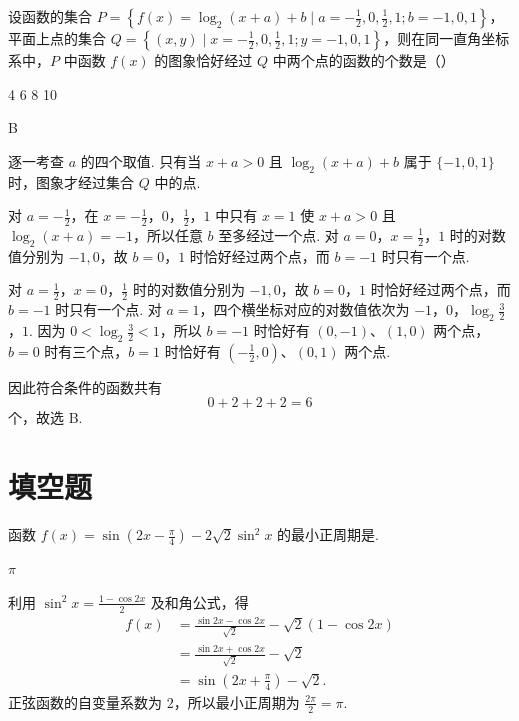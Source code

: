 \begin{problem}
设函数的集合 \(P = \left\{f(x) = \log_2(x + a) + b \mid a = -\frac{1}{2}, 0, \frac{1}{2}, 1; b = -1, 0, 1\right\}\)，平面上点的集合 \(Q = \left\{(x, y) \mid x = -\frac{1}{2}, 0, \frac{1}{2}, 1; y = -1, 0, 1\right\}\)，则在同一直角坐标系中，\(P\) 中函数 \(f(x)\) 的图象恰好经过 \(Q\) 中两个点的函数的个数是（\quad）

\choices
    {4}
    {6}
    {8}
    {10}
\begin{answer}
B
\end{answer}

\begin{solution}
逐一考查 \(a\) 的四个取值. 只有当 \(x+a>0\) 且 \(\log_2(x+a)+b\) 属于 \(\{-1,0,1\}\) 时，图象才经过集合 \(Q\) 中的点.

对 \(a=-\frac12\)，在 \(x=-\frac12\)，\(0\)，\(\frac12\)，\(1\) 中只有 \(x=1\) 使 \(x+a>0\) 且 \(\log_2(x+a)=-1\)，所以任意 \(b\) 至多经过一个点. 对 \(a=0\)，\(x=\frac12\)，\(1\) 时的对数值分别为 \(-1,0\)，故 \(b=0\)，\(1\) 时恰好经过两个点，而 \(b=-1\) 时只有一个点.

对 \(a=\frac12\)，\(x=0\)，\(\frac12\) 时的对数值分别为 \(-1,0\)，故 \(b=0\)，\(1\) 时恰好经过两个点，而 \(b=-1\) 时只有一个点. 对 \(a=1\)，四个横坐标对应的对数值依次为 \(-1\)，\(0\)，\(\log_2\frac32\)，\(1\). 因为 \(0<\log_2\frac32<1\)，所以 \(b=-1\) 时恰好有 \((0,-1)\)、\((1,0)\) 两个点，\(b=0\) 时有三个点，\(b=1\) 时恰好有 \((-\frac12,0)\)、\((0,1)\) 两个点.

因此符合条件的函数共有
\[
0+2+2+2=6
\]
个，故选 B.
\end{solution}
\end{problem}

\section{填空题}

\begin{problem}
函数 \( f(x) = \sin \left(2x - \frac{\pi}{4}\right) - 2\sqrt{2}\sin^2 x \) 的最小正周期是\fillinblank{}.
\begin{answer}
\(\pi\)
\end{answer}

\begin{solution}
利用 \(\sin^2x=\frac{1-\cos2x}{2}\) 及和角公式，得
\[
\begin{aligned}
f(x)&=\frac{\sin2x-\cos2x}{\sqrt2}-\sqrt2(1-\cos2x)\\
&=\frac{\sin2x+\cos2x}{\sqrt2}-\sqrt2\\
&=\sin\left(2x+\frac\pi4\right)-\sqrt2.
\end{aligned}
\]
正弦函数的自变量系数为 \(2\)，所以最小正周期为 \(\frac{2\pi}{2}=\pi\).
\end{solution}
\end{problem}

